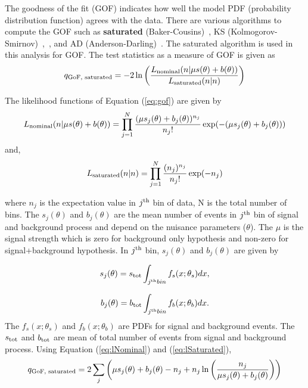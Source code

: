 The goodness of the fit (GOF) indicates how well the model PDF (probability
distribution function) agrees with the data. There are various algorithms to 
compute the GOF such as {\bf{saturated}} (Baker-Cousins)~\cite{Baker:1983tu}, KS
(Kolmogorov-Smirnov)~\cite{ks1},~\cite{smirnov1948}, and 
AD (Anderson-Darling)~\cite{anderson1952}. The saturated algorithm is used in this analysis
for GOF. The test statistics as a measure of GOF is given as \cite{Baker:1983tu}
\begin{equation}
q_{\rm{GoF, saturated}} = -2\ln \left(\frac{L_{\rm{nominal}} (n|\mu s(\theta) + b(\theta))}{L_{\rm{saturated}}(n|n)}\right)
\label{eq:gof}
\end{equation}

The likelihood functions of Equation (\ref{eq:gof}) are given by
\begin{equation}
L_{\rm{nominal}} (n|\mu s(\theta) + b(\theta)) = \prod_{j=1}^N \frac{(\mu s_j(\theta) + b_j(\theta))^{n_j}}{n_{j}!} \exp(-(\mu s_j(\theta) + b_j(\theta)))
\label{eq:lNominal}
\end{equation}
and,
\begin{equation}
L_{\rm{saturated}} (n|n) = \prod_{j=1}^N \frac{(n_j)^{n_j}}{n_{j}!} \exp(-n_j)
\label{eq:lSaturated}
\end{equation}


where $n_j$ is the expectation value in $j^{\rm{th}}$ bin of data, N is the total number of bins. The
$s_j(\theta)$ and $b_j(\theta)$ are the mean number of events in $j^{\rm{th}}$ bin of signal and background
process and depend on the nuisance parameters ($\theta$). The $\mu$ is the signal strength which is
zero for background only hypothesis and non-zero for signal+background hypothesis. In $j^{\rm{th}}$ 
bin, $s_j(\theta)$ and $b_j(\theta)$ are given by \cite{Cowan:2010js}

\begin{equation}
s_{j}(\theta) = s_{\rm{tot}}\int_{j^{\rm{th}} bin} f_s(x; \theta_s)dx,
\end{equation}

\begin{equation}
b_{j}(\theta) = b_{\rm{tot}}\int_{j^{\rm{th}} bin} f_b(x; \theta_b)dx.
\end{equation}
The $f_s(x; \theta_s)$ and $f_b(x; \theta_b)$ are PDFs for signal and background events. The 
$s_{\rm{tot}}$ and $b_{\rm{tot}}$ are mean of total number of events from signal and background 
process. Using Equation (\ref{eq:lNominal}) and (\ref{eq:lSaturated}),
\begin{equation}
q_{\rm{GoF, saturated}} = 2\sum_{j}\left(\mu s_j(\theta) + b_j(\theta) - n_j + n_j\ln\left(\frac{n_j}{\mu s_j(\theta) + b_j(\theta)}\right)\right)
\label{eq:gofFinal}
\end{equation}

